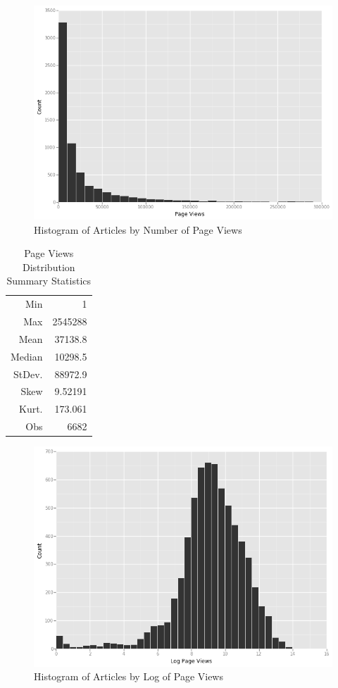 \documentclass[fleqn,12pt]{SelfArx} %
\begin{document}
\begin{figure}[ht]\centering
\includegraphics[width=\linewidth]{pageviews_hist}
\caption{Histogram of Articles by Number of Page Views}
\label{fig:pv_hist}
\end{figure}
\begin{table}[hbt]
\caption{Page Views Distribution Summary Statistics}
\centering
\begin{tabular}{rr}
\toprule
Min               &  1\\
Max               &  2545288\\  
Mean              &  37138.8\\
Median            &  10298.5\\
StDev.         &  88972.9\\
Skew          &  9.52191\\
Kurt.          &  173.061\\
\midrule
Obs &  6682\\
\bottomrule
\end{tabular}
\end{table}

\begin{figure}[ht]\centering
\includegraphics[width=\linewidth]{log_pageviews_hist}
\caption{Histogram of Articles by Log of Page Views}
\label{fig:lpv_hist}
\end{figure}
\end{document}
